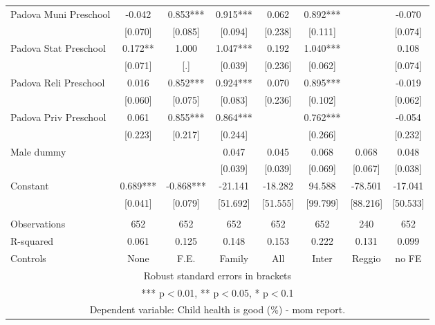 \begin{tabular}{lccccccc}
Padova Muni Preschool & -0.042 & 0.853*** & 0.915*** & 0.062 & 0.892*** &  & -0.070 \\
 & [0.070] & [0.085] & [0.094] & [0.238] & [0.111] &  & [0.074] \\
Padova Stat Preschool & 0.172** & 1.000 & 1.047*** & 0.192 & 1.040*** &  & 0.108 \\
 & [0.071] & [.] & [0.039] & [0.236] & [0.062] &  & [0.074] \\
Padova Reli Preschool & 0.016 & 0.852*** & 0.924*** & 0.070 & 0.895*** &  & -0.019 \\
 & [0.060] & [0.075] & [0.083] & [0.236] & [0.102] &  & [0.062] \\
Padova Priv Preschool & 0.061 & 0.855*** & 0.864*** &  & 0.762*** &  & -0.054 \\
 & [0.223] & [0.217] & [0.244] &  & [0.266] &  & [0.232] \\
Male dummy &  &  & 0.047 & 0.045 & 0.068 & 0.068 & 0.048 \\
 &  &  & [0.039] & [0.039] & [0.069] & [0.067] & [0.038] \\
Constant & 0.689*** & -0.868*** & -21.141 & -18.282 & 94.588 & -78.501 & -17.041 \\
 & [0.041] & [0.079] & [51.692] & [51.555] & [99.799] & [88.216] & [50.533] \\
 &  &  &  &  &  &  &  \\
Observations & 652 & 652 & 652 & 652 & 652 & 240 & 652 \\
R-squared & 0.061 & 0.125 & 0.148 & 0.153 & 0.222 & 0.131 & 0.099 \\
 Controls & None & F.E. & Family & All & Inter & Reggio & no FE \\ \hline
\multicolumn{8}{c}{ Robust standard errors in brackets} \\
\multicolumn{8}{c}{ *** p$<$0.01, ** p$<$0.05, * p$<$0.1} \\
\multicolumn{8}{c}{ Dependent variable: Child health is good (\%) - mom report.} \\
\end{tabular}

